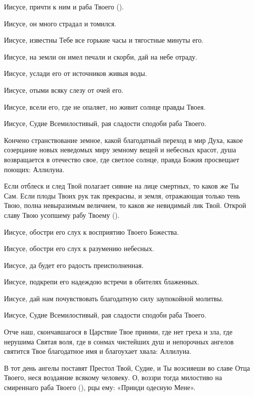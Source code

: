 \begin{mymulticols}
Иисусе, причти к ним и раба Твоего (). 

Иисусе, он много страдал и томился. 

Иисусе, известны Тебе все горькие часы и тягостные минуты его. 

Иисусе, на земли он имел печали и скорби, дай на небе отраду. 

Иисусе, услади его от источников живыя воды. 

Иисусе, отыми всяку слезу от очей его. 

Иисусе, всели его, где не опаляет, но живит солнце правды Твоея. 

Иисусе, Судие Всемилостивый, рая сладости сподоби раба Твоего.




Кончено странствование земное, какой благодатный переход в мир Духа, какое созерцание новых неведомых миру земному вещей и небесных красот, душа возвращается в отечество свое, где светлое солнце, правда Божия просвещает поющих: Аллилуиа.




Если отблеск и след Твой полагает сияние на лице смертных, то каков же Ты Сам. Если плоды Твоих рук так прекрасны, и земля, отражающая только тень Твою, полна невыразимым величием, то каков же невидимый лик Твой. Открой славу Твою усопшему рабу Твоему (). 

Иисусе, обостри его слух к восприятию Твоего Божества. 

Иисусе, обостри его слух к разумению небесных. 

Иисусе, да будет его радость преисполненная. 

Иисусе, подкрепи его надеждою встречи в обителях блаженных. 

Иисусе, дай нам почувствовать благодатную силу заупокойной молитвы. 

Иисусе, Судие Всемилостивый, рая сладости сподоби раба Твоего.




Отче наш, скончавшагося в Царствие Твое приими, где нет греха и зла, где нерушима Святая воля, где в сонмах чистейших душ и непорочных ангелов святится Твое благодатное имя и благоухает хвала: Аллилуиа.




В тот день ангелы поставят Престол Твой, Судие, и Ты возсияеши во славе Отца Твоего, неся воздаяние всякому человеку. О, воззри тогда милостиво на смиреннаго раба Твоего (), рцы ему: «Прииди одесную Мене». 


\end{mymulticols}
